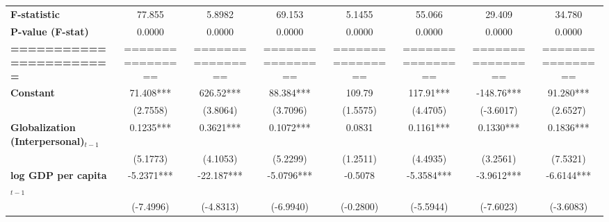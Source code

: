 \begin{center}
\begin{tabular}{lccccccc}
\textbf{F-statistic}               &        77.855        &            5.8982           &            69.153            &                5.1455               &              55.066              &            29.409           &             34.780             \\
\textbf{P-value (F-stat)}          &        0.0000        &            0.0000           &            0.0000            &                0.0000               &              0.0000              &            0.0000           &             0.0000             \\
\textbf{=======================}   &   ================   &       ================      &       ================       &           ================          &         ================         &       ================      &        ================        \\
\textbf{Constant}                     &      71.408***       &          626.52***          &          88.384***           &                109.79               &            117.91***             &          -148.76***         &           91.280***            \\
\textbf{ }                         &       (2.7558)       &           (3.8064)          &           (3.7096)           &               (1.5575)              &             (4.4705)             &          (-3.6017)          &            (2.6527)            \\
\textbf{Globalization (Interpersonal)$_{t-1}$}             &      0.1235***       &          0.3621***          &          0.1072***           &                0.0831               &            0.1161***             &          0.1330***          &           0.1836***            \\
\textbf{ }                         &       (5.1773)       &           (4.1053)          &           (5.2299)           &               (1.2511)              &             (4.4935)             &           (3.2561)          &            (7.5321)            \\
\textbf{log GDP per capita$_{t-1}$}           &      -5.2371***      &          -22.187***         &          -5.0796***          &               -0.5078               &            -5.3584***            &          -3.9612***         &           -6.6144***           \\
\textbf{ }                         &      (-7.4996)       &          (-4.8313)          &          (-6.9940)           &              (-0.2800)              &            (-5.5944)             &          (-7.6023)          &           (-3.6083)            \\

\end{tabular}
\end{center}
